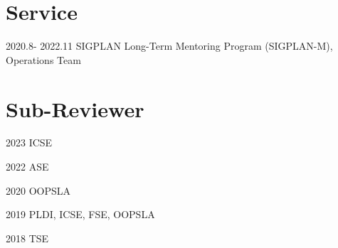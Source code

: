 \documentclass[12pt,letterpaper]{report}
\newcommand{\listitemspace}{0.15em}
\renewenvironment{itemize}
{\begin{list}{}{\setlength{\leftmargin}{0em}
			\setlength{\parskip}{0em}
			\setlength{\itemsep}{\listitemspace}
			\setlength{\parsep}{\listitemspace}}}
	{\end{list}}
\begin{document}
\vspace{-0.5em}
\section*{Service}
\begin{tablist}[style=multiline, leftmargin=*]
	\item[2020.8- 2022.11] \tab SIGPLAN Long-Term Mentoring Program (SIGPLAN-M), Operations Team
\end{tablist}

\section*{Sub-Reviewer}
\begin{tablist}
	\item[2023] \tab ICSE
	\item[2022] \tab ASE
	\item[2020] \tab OOPSLA
	\item[2019] \tab PLDI, ICSE, FSE, OOPSLA
	\item[2018] \tab TSE
\end{tablist}


%
%
%
%
%
%
%
%
%
%
%
\end{document}
